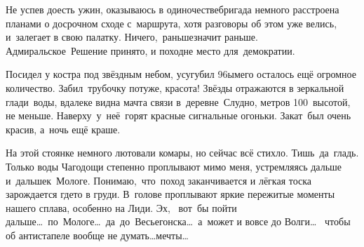 Не успев доесть ужин, оказываюсь в одиночестве\mdash бригада немного расстроена планами о досрочном сходе с~маршрута, хотя разговоры об этом уже велись, и~залегает в свою палатку. Ничего,~раньше\mdash значит раньше. Адмиральское~Решение принято, и поход\mdash не место для~демократии. 

Посидел у костра под звёздным небом, усугубил 96\sdash ым\mdash его осталось ещё огромное количество. Забил~трубочку потуже, красота! Звёзды отражаются в зеркальной глади~воды, вдалеке видна мачта связи в~деревне~Слудно, метров 100~высотой, не меньше. Наверху~у~неё~горят красные сигнальные огоньки. Закат~был очень красив, а~ночь ещё краше. 

На этой стоянке немного лютовали комары, но сейчас всё стихло. Тишь~да~гладь. Только воды Чагодощи степенно проплывают мимо меня, устремляясь дальше и~дальше\mdash к~Мологе. Понимаю,~что~поход заканчивается и лёгкая тоска зарождается где\sdash то в груди. В~голове проплывают яркие пережитые моменты нашего сплава, особенно на Лиди. \newpage Эх,~ вот~бы пойти дальше\ldots~по~Мологе\ldots~да~до~Весьегонска\ldots~а~может и вовсе до Волги\ldots~ чтобы об антистапеле вообще не думать\ldots мечты\ldots

\begin{center}
\end{center}